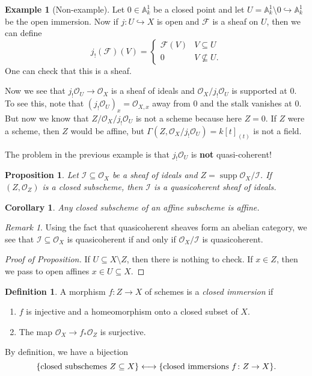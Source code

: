 \documentclass[leqno, openany]{memoir}
\newtheorem{cor}[thm]{Corollary}
\newtheorem{prop}[thm]{Proposition}
\theoremstyle{definition}
\newtheorem{defn}[thm]{Definition}
\newtheorem{exm}[thm]{Example}
\theoremstyle{remark}
\newtheorem{rmk}[thm]{Remark}
\theoremstyle{plain}
\theoremstyle{definition}
\theoremstyle{remark}
\newcommand{\A}{\mathbb{A}}
\newcommand{\msc}[1]{\mathscr{#1}}
\DeclareMathOperator{\supp}{supp}
\begin{document}
\begin{exm}[Non-example]
    Let $0 \in \A^1_k$ be a closed point and let $U = \A^1_k \setminus \qty{0} \hookrightarrow \A^1_k$ be the open immersion. Now if $j \colon U \hookrightarrow X$ is open and $\msc{F}$ is a sheaf on $U$, then we can define
    \[ j_! (\msc{F})(V) = \begin{cases}
        \msc{F}(V) & V \subseteq U \\
        0 & V \not\subseteq U.
    \end{cases} \]
    One can check that this is a sheaf.
    
    Now we see that $j_! \msc{O}_U \to \msc{O}_X$ is a sheaf of ideals and $\msc{O}_X/j_! \msc{O}_U$ is supported at $0$. To see this, note that ${ ( j_! \msc{O}_U ) }_x = \msc{O}_{X,x}$ away from $0$ and the stalk vanishes at $0$. But now we know that $Z/\msc{O}_X/j_! \msc{O}_U$ is not a scheme because here $Z = \qty{0}$. If $Z$ were a scheme, then $Z$ would be affine, but $\Gamma(Z, \msc{O}_X/j_! \msc{O}_U) = { k[t] }_(t)$ is not a field.
\end{exm}

The problem in the previous example is that $j_! \msc{O}_U$ is \textbf{not} quasi-coherent!

\begin{prop}
    Let $\msc{I} \subseteq \msc{O}_X$ be a sheaf of ideals and $Z = \supp \msc{O}_X/\msc{I}$. If $(Z, \msc{O}_Z)$ is a closed subscheme, then $\msc{I}$ is a quasicoherent sheaf of ideals.
\end{prop}

\begin{cor}
    Any closed subscheme of an affine subscheme is affine.
\end{cor}

\begin{rmk}
    Using the fact that quasicoherent sheaves form an abelian category, we see that $\msc{I} \subseteq \msc{O}_X$ is quasicoherent if and only if $\msc{O}_X/\msc{I}$ is quasicoherent.
\end{rmk}

\begin{proof}[Proof of Proposition]
    If $U \subseteq X \setminus Z$, then there is nothing to check. If $x \in Z$, then we pass to open affines $x \in U \subseteq X$.
\end{proof}

\begin{defn}
    A morphism $f \colon Z \to X$ of schemes is a \textit{closed immersion} if
    \begin{enumerate}
        \item $f$ is injective and a homeomorphism onto a closed subset of $X$.
        \item The map $\msc{O}_X \to f_* \msc{O}_Z$ is surjective.
    \end{enumerate}
    By definition, we have a bijection
    \[ \qty{\text{closed subschemes }Z \subseteq X} \longleftrightarrow \qty{\text{closed immersions } f \colon Z \to X}. \]
\end{defn}
\end{document}
